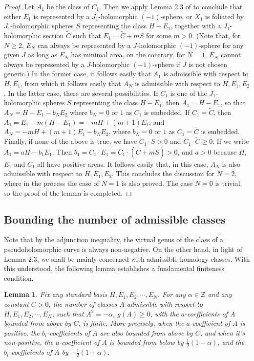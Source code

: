 \documentclass[11pt]{amsart}
\theoremstyle{plain}
\numberwithin{theorem}{section}
\newtheorem{lemma}[theorem]{Lemma}
\theoremstyle{definition}
\newcommand{\Z}{{\mathbb Z}}
\begin{document}
\begin{proof}
Let $A_1$ be the class of $C_1$. Then we apply Lemma 2.3 of \cite{C2} to conclude that either 
$E_1$ is represented by a $J_1$-holomorphic $(-1)$-sphere, or $X_1$ is foliated by $J_1$-holomorphic spheres $S$ representing the class $H-E_1$, together with a $J_1$-holomorphic section $\tilde{C}$ such that $E_1=\tilde{C}+m S$ for some $m>0$. (Note that, for $N\geq 2$, $E_N$ can always be represented by a $J$-holomorphic 
$(-1)$-sphere for any given $J$ as long as $E_N$ has minimal area, on the contrary, for $N=1$,
$E_N$ cannot always be represented by a $J$-holomorphic $(-1)$-sphere if $J$ is not chosen generic.) In the former case, it follows easily that $A_1$ is admissible with respect to $H,E_1$, from which it follows easily that 
$A_N$ is admissible with respect to $H,E_1, E_2$. In the latter case, there are several possibilities. If $C_1$ is one of the $J_1$-holomorphic spheres $S$ representing the class $H-E_1$, then $A_1=H-E_1$, so that $A_N=H-E_1-b_NE_2$ where $b_N=0$ or $1$ as $C_1$ is embedded. If $C_1=\tilde{C}$, then 
$A_1=E_1-m(H-E_1)=-mH+(m+1)E_1$, and $A_N=-mH+(m+1)E_1-b_NE_2$, where $b_N=0$ or $1$ as $C_1=\tilde{C}$ is embedded. 
Finally, if none of the above is true, we have $C_1\cdot S>0$ and $C_1\cdot \tilde{C}\geq 0$. If we write $A_1=aH-b_1E_1$. Then $b_1=C_1\cdot E_1=C_1\cdot (\tilde{C}+mS)>0$, and $a>0$ because $H$, $E_1$ and $C_1$ all have positive areas. It follows easily that, in this case, $A_N$ is also admissible with respect to $H,E_1, E_2$. This concludes the discussion for $N=2$, where in the process the case of $N=1$ is also proved. The case $N=0$ is trivial, so the proof of the lemma is completed. 

\end{proof}

\subsection{Bounding the number of admissible classes}
Note that by the adjunction inequality, the virtual genus of the class of a pseudoholomorphic curve
is always non-negative. On the other hand, in light of Lemma 2.3, we shall be mainly concerned with admissible homology classes. With this understood, the following lemma establishes a fundamental finiteness condition. 

\begin{lemma}
Fix any standard basis $H,E_1,E_2,\cdots,E_N$. For any $\alpha\in\Z$ and any constant $C>0$,
the number of classes $A$ admissible with respect to $H,E_1,E_2,\cdots,E_N$, such that
$A^2=-\alpha$, $g(A)\geq 0$, with the $a$-coefficients of $A$ bounded from above by $C$, is finite.
More precisely, when the $a$-coefficient of $A$ is positive, the $b_i$-coefficients of $A$ are also bounded from above by $C$, and when it's non-positive, the $a$-coefficient of $A$ is bounded from below
by $\frac{1}{2}(1-\alpha)$, and the $b_i$-coefficients of $A$ by $-\frac{1}{2}(1+\alpha)$. 
\end{lemma}
\end{document}
